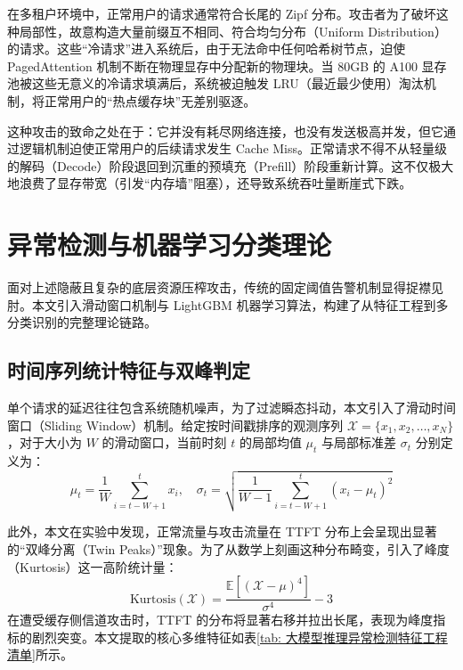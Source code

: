 \documentclass[master, vlined]{DissertUESTC}
\begin{document}
	在多租户环境中，正常用户的请求通常符合长尾的 Zipf 分布。攻击者为了破坏这种局部性，故意构造大量前缀互不相同、符合均匀分布（Uniform Distribution）的请求。这些“冷请求”进入系统后，由于无法命中任何哈希树节点，迫使 PagedAttention 机制不断在物理显存中分配新的物理块。当 80GB 的 A100 显存池被这些无意义的冷请求填满后，系统被迫触发 LRU（最近最少使用）淘汰机制，将正常用户的“热点缓存块”无差别驱逐。
	
	这种攻击的致命之处在于：它并没有耗尽网络连接，也没有发送极高并发，但它通过逻辑机制迫使正常用户的后续请求发生 Cache Miss。正常请求不得不从轻量级的解码（Decode）阶段退回到沉重的预填充（Prefill）阶段重新计算。这不仅极大地浪费了显存带宽（引发“内存墙”阻塞），还导致系统吞吐量断崖式下跌。

	\section{异常检测与机器学习分类理论}
	
	面对上述隐蔽且复杂的底层资源压榨攻击，传统的固定阈值告警机制显得捉襟见肘。本文引入滑动窗口机制与 LightGBM 机器学习算法，构建了从特征工程到多分类识别的完整理论链路。

	\subsection{时间序列统计特征与双峰判定}
	单个请求的延迟往往包含系统随机噪声，为了过滤瞬态抖动，本文引入了滑动时间窗口（Sliding Window）机制。给定按时间戳排序的观测序列 $\mathcal{X} = \{x_1, x_2, \dots, x_N\}$，对于大小为 $W$ 的滑动窗口，当前时刻 $t$ 的局部均值 $\mu_t$ 与局部标准差 $\sigma_t$ 分别定义为：
	\begin{equation}
		\mu_t = \frac{1}{W} \sum_{i=t-W+1}^{t} x_i, \quad \sigma_t = \sqrt{\frac{1}{W-1} \sum_{i=t-W+1}^{t} (x_i - \mu_t)^2}
	\end{equation}

	此外，本文在实验中发现，正常流量与攻击流量在 TTFT 分布上会呈现出显著的“双峰分离（Twin Peaks）”现象。为了从数学上刻画这种分布畸变，引入了峰度（Kurtosis）这一高阶统计量：
	\begin{equation}
		\text{Kurtosis}(\mathcal{X}) = \frac{\mathbb{E}[(\mathcal{X} - \mu)^4]}{\sigma^4} - 3
	\end{equation}
	在遭受缓存侧信道攻击时，TTFT 的分布将显著右移并拉出长尾，表现为峰度指标的剧烈突变。本文提取的核心多维特征如表\ref{tab: 大模型推理异常检测特征工程清单}所示。
\end{document}
